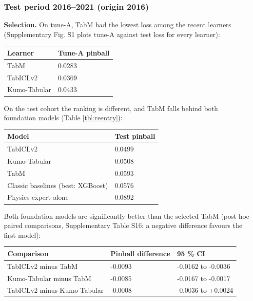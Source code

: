 \documentclass[
]{article}
\newcounter{none} %
\begin{document}
\subsubsection{Test period 2016--2021 (origin
2016)}\label{test-period-20162021-origin-2016}

\textbf{Selection.} On tune-A, TabM had the lowest loss among the recent
learners (Supplementary Fig. S1 plots tune-A against test loss for every
learner):

{\def\LTcaptype{none} %
\begin{longtable}[]{@{}ll@{}}
\toprule\noalign{}
Learner & Tune-A pinball \\
\midrule\noalign{}
\endhead
\bottomrule\noalign{}
\endlastfoot
TabM & 0.0283 \\
TabICLv2 & 0.0369 \\
Kumo-Tabular & 0.0433 \\
\end{longtable}
}

On the test cohort the ranking is different, and TabM falls behind both
foundation models (Table \ref{tbl:reentry}):

{\def\LTcaptype{none} %
\begin{longtable}[]{@{}ll@{}}
\toprule\noalign{}
Model & Test pinball \\
\midrule\noalign{}
\endhead
\bottomrule\noalign{}
\endlastfoot
TabICLv2 & 0.0499 \\
Kumo-Tabular & 0.0508 \\
TabM & 0.0593 \\
Classic baselines (best: XGBoost) & 0.0576 \\
Physics expert alone & 0.0892 \\
\end{longtable}
}

Both foundation models are significantly better than the selected TabM
(post-hoc paired comparisons, Supplementary Table S16; a negative
difference favours the first model):

{\def\LTcaptype{none} %
\begin{longtable}[]{@{}lll@{}}
\toprule\noalign{}
Comparison & Pinball difference & 95 \% CI \\
\midrule\noalign{}
\endhead
\bottomrule\noalign{}
\endlastfoot
TabICLv2 minus TabM & -0.0093 & -0.0162 to -0.0036 \\
Kumo-Tabular minus TabM & -0.0085 & -0.0167 to -0.0017 \\
TabICLv2 minus Kumo-Tabular & -0.0008 & -0.0036 to +0.0024 \\
\end{longtable}
}
\end{document}
